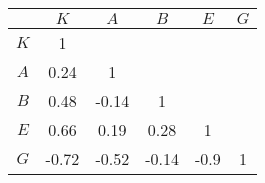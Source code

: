 \begin{tabular}{c  c  c  c  c  c}\hline \hline
     &  $K$      &     $A$   &      $B$   &      $E$  & $G$ \\ \hline
 $K$ &     1     &           &            &           &   \\ 
 $A$ & 0.24 &      1    &            &           &   \\ 
 $B$ & 0.48 & -0.14 &      1     &           &   \\ 
 $E$ & 0.66 & 0.19 & 0.28 &      1    &   \\ 
 $G$ & -0.72 & -0.52 & -0.14 & -0.9 & 1 \\ \hline \hline
\end{tabular}
